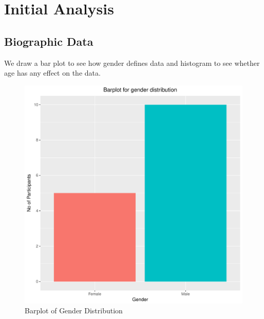 \documentclass[12pt,epsf]{report}
\begin{document}
\section*{Initial Analysis}
\subsection*{Biographic Data}
We draw a bar plot to see how gender defines data and histogram to see whether age has any effect on the data.\\
\begin{figure}[!htb]
	\begin{minipage}[c]{0.5\linewidth}
	\includegraphics[width=\linewidth]{1_gender.pdf}
	\caption{Barplot of Gender Distribution}
	\end{minipage}
	\hfill
	\begin{minipage}[c]{0.5\linewidth}

\end{minipage}
\end{figure}
\end{document}
